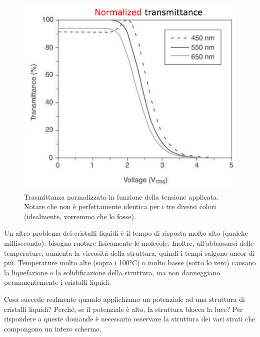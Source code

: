 \documentclass[a4paper,11pt]{article}
\begin{document}
\renewcommand{\thefigure}{4.4}
\begin{figure}[!h]
  \centering
    \includegraphics[scale=0.6]{images/4/trasmittance.png}
    \caption{Trasmittanza normalizzata in funzione della tensione applicata. Notare che non è perfettamente identica per i tre diversi colori (idealmente, vorremmo che lo fosse).}
\end{figure}

Un altro problema dei cristalli liquidi è il tempo di risposta molto alto (qualche millisecondo): bisogna ruotare fisicamente le molecole.
Inoltre, all'abbassarsi delle temperature, aumenta la viscosità della struttura, quindi i tempi salgono ancor di più. Temperature molto alte (sopra i 100°C) o molto basse (sotto lo zero)
causano la liquefazione o la solidificazione della struttura, ma non danneggiano permanentemente i cristalli liquidi.
\par
Cosa succede realmente quando applichiamo un potenziale ad una struttura di cristalli liquidi? Perché, se il potenziale è alto,
la struttura blocca la luce? Per rispondere a queste domande è necessario osservare la struttura dei vari strati
che compongono un intero schermo.
\newpage
\end{document}
